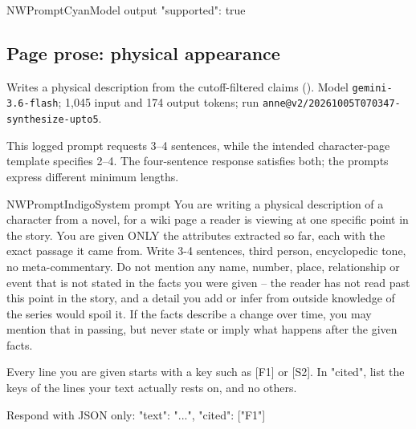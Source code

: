\begin{nwprompt}{NWPromptCyan}{Model output}
{"supported": true}
\end{nwprompt}

\subsection*{Page prose: physical appearance}
Writes a physical description from the cutoff-filtered claims (\sys). Model \texttt{gemini-3.6-flash}; 1,045 input and 174 output tokens; run \nolinkurl{anne@v2/20261005T070347-synthesize-upto5}.

This logged prompt requests 3--4 sentences, while the intended character-page template
specifies 2--4. The four-sentence response satisfies both; the prompts express different
minimum lengths.

\begin{nwprompt}{NWPromptIndigo}{System prompt}
You are writing a physical description of a character from a novel, for a wiki page a reader is viewing at one specific point in the story. You are given ONLY the attributes extracted so far, each with the exact passage it came from. Write 3-4 sentences, third person, encyclopedic tone, no meta-commentary. Do not mention any name, number, place, relationship or event that is not stated in the facts you were given -- the reader has not read past this point in the story, and a detail you add or infer from outside knowledge of the series would spoil it. If the facts describe a change over time, you may mention that in passing, but never state or imply what happens after the given facts.

Every line you are given starts with a key such as [F1] or [S2]. In "cited", list the keys of the lines your text actually rests on, and no others.

Respond with JSON only: {"text": "...", "cited": ["F1"]}
\end{nwprompt}

